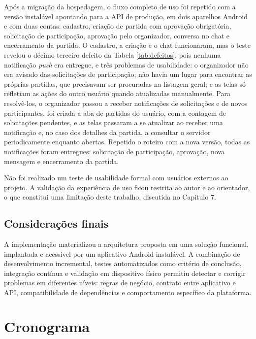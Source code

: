 \documentclass[a4paper, 12pt]{article}
\begin{document}
\begin{justify}
Após a migração da hospedagem, o fluxo completo de uso foi repetido com a versão instalável apontando para a API de produção, em dois aparelhos Android e com duas contas: cadastro, criação de partida com aprovação obrigatória, solicitação de participação, aprovação pelo organizador, conversa no chat e encerramento da partida. O cadastro, a criação e o chat funcionaram, mas o teste revelou o décimo terceiro defeito da Tabela \ref{tab:defeitos}, pois nenhuma notificação \textit{push} era entregue, e três problemas de usabilidade: o organizador não era avisado das solicitações de participação; não havia um lugar para encontrar as próprias partidas, que precisavam ser procuradas na listagem geral; e as telas só refletiam as ações do outro usuário quando atualizadas manualmente. Para resolvê-los, o organizador passou a receber notificações de solicitações e de novos participantes, foi criada a aba de partidas do usuário, com a contagem de solicitações pendentes, e as telas passaram a se atualizar ao receber uma notificação e, no caso dos detalhes da partida, a consultar o servidor periodicamente enquanto abertas. Repetido o roteiro com a nova versão, todas as notificações foram entregues: solicitação de participação, aprovação, nova mensagem e encerramento da partida.

Não foi realizado um teste de usabilidade formal com usuários externos ao projeto. A validação da experiência de uso ficou restrita ao autor e ao orientador, o que constitui uma limitação deste trabalho, discutida no Capítulo 7.

\subsection{Considerações finais}

A implementação materializou a arquitetura proposta em uma solução funcional, implantada e acessível por um aplicativo Android instalável. A combinação de desenvolvimento incremental, testes automatizados como critério de conclusão, integração contínua e validação em dispositivo físico permitiu detectar e corrigir problemas em diferentes níveis: regras de negócio, contrato entre aplicativo e API, compatibilidade de dependências e comportamento específico da plataforma.

\clearpage

\section{Cronograma}


\end{justify}
\end{document}
